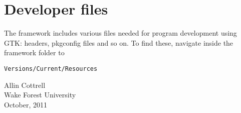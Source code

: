 \documentclass[11pt]{article}
\begin{document}
\section{Developer files}

The framework includes various files needed for program development
using GTK: headers, pkgconfig files and so on. To find these, navigate
inside the framework folder to 

\verb|Versions/Current/Resources|

\vspace{1ex}

\raggedright
Allin Cottrell \\
Wake Forest University \\
October, 2011
\end{document}
